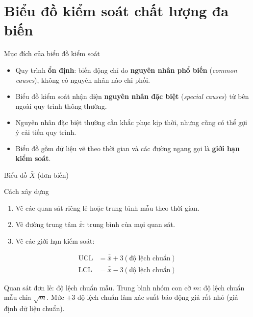 \section{Biểu đồ kiểm soát chất lượng đa biến}
\setcounter{equation}{0}

\begin{frame}{Mục đích của biểu đồ kiểm soát}
  \begin{itemize}
    \item Quy trình \textbf{ổn định}: biến động chỉ do \textbf{nguyên nhân phổ biến} (\textit{common causes}), không có nguyên nhân nào chi phối.
    \item Biểu đồ kiểm soát nhận diện \textbf{nguyên nhân đặc biệt} (\textit{special causes}) từ bên ngoài quy trình thông thường.
    \item Nguyên nhân đặc biệt thường cần khắc phục kịp thời, nhưng cũng có thể gợi ý cải tiến quy trình.
    \item Biểu đồ gồm dữ liệu vẽ theo thời gian và các đường ngang gọi là \textbf{giới hạn kiểm soát}.
  \end{itemize}
\end{frame}

\begin{frame}{Biểu đồ \(\bar{X}\) (đơn biến)}
  \begin{block}{Cách xây dựng}
    \begin{enumerate}
      \item Vẽ các quan sát riêng lẻ hoặc trung bình mẫu theo thời gian.
      \item Vẽ đường trung tâm \(\bar{\bar{x}}\): trung bình của mọi quan sát.
      \item Vẽ các giới hạn kiểm soát:
    \end{enumerate}
    \begin{align*}
      \mathrm{UCL}&=\bar{\bar{x}}+3(\text{độ lệch chuẩn})\\
      \mathrm{LCL}&=\bar{\bar{x}}-3(\text{độ lệch chuẩn})
    \end{align*}
  \end{block}
  \small Quan sát đơn lẻ: độ lệch chuẩn mẫu. Trung bình nhóm con cỡ \(m\): độ lệch chuẩn mẫu chia \(\sqrt{m}\). Mức \(\pm3\) độ lệch chuẩn làm xác suất báo động giả rất nhỏ (giả định dữ liệu chuẩn).
\end{frame}

